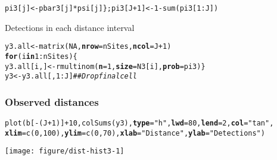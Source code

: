 \documentclass[color=usenames,dvipsnames]{beamer}\usepackage[]{graphicx}\usepackage[]{color}
\makeatletter
\newcommand{\hlnum}[1]{\textcolor[rgb]{0.69,0.494,0}{#1}}%
\newcommand{\hlstr}[1]{\textcolor[rgb]{0.749,0.012,0.012}{#1}}%
\newcommand{\hlcom}[1]{\textcolor[rgb]{0.514,0.506,0.514}{\textit{#1}}}%
\newcommand{\hlopt}[1]{\textcolor[rgb]{0,0,0}{#1}}%
\newcommand{\hlstd}[1]{\textcolor[rgb]{0,0,0}{#1}}%
\newcommand{\hlkwa}[1]{\textcolor[rgb]{0,0,0}{\textbf{#1}}}%
\newcommand{\hlkwb}[1]{\textcolor[rgb]{0,0.341,0.682}{#1}}%
\newcommand{\hlkwc}[1]{\textcolor[rgb]{0,0,0}{\textbf{#1}}}%
\newcommand{\hlkwd}[1]{\textcolor[rgb]{0.004,0.004,0.506}{#1}}%
\newenvironment{kframe}{%
 \def\at@end@of@kframe{}%
 \ifinner\ifhmode%
  \def\at@end@of@kframe{\end{minipage}}%
  \begin{minipage}{\columnwidth}%
 \fi\fi%
 \def\FrameCommand##1{\hskip\@totalleftmargin \hskip-\fboxsep
 \colorbox{shadecolor}{##1}\hskip-\fboxsep
     \hskip-\linewidth \hskip-\@totalleftmargin \hskip\columnwidth}%
 \MakeFramed {\advance\hsize-\width
   \@totalleftmargin\z@ \linewidth\hsize
   \@setminipage}}%
 {\par\unskip\endMakeFramed%
 \at@end@of@kframe}
\newenvironment{knitrout}{}{} %
\makeatother
\begin{document}
\begin{frame}[fragile]
\begin{knitrout}
\begin{kframe}
\begin{alltt}
    \hlstd{pi3[j]} \hlkwb{<-} \hlstd{pbar3[j]}\hlopt{*}\hlstd{psi[j] \}; pi3[J}\hlopt{+}\hlnum{1}\hlstd{]} \hlkwb{<-} \hlnum{1}\hlopt{-}\hlkwd{sum}\hlstd{(pi3[}\hlnum{1}\hlopt{:}\hlstd{J])}
\end{alltt}
\end{kframe}
\end{knitrout}
  \pause
  \vfill
  Detections in each distance interval
  \vspace{-6pt}
\begin{knitrout}\scriptsize
{}\color{fgcolor}\begin{kframe}
\begin{alltt}
\hlstd{y3.all} \hlkwb{<-} \hlkwd{matrix}\hlstd{(}\hlnum{NA}\hlstd{,} \hlkwc{nrow}\hlstd{=nSites,} \hlkwc{ncol}\hlstd{=J}\hlopt{+}\hlnum{1}\hlstd{)}
\hlkwa{for}\hlstd{(i} \hlkwa{in} \hlnum{1}\hlopt{:}\hlstd{nSites) \{}
    \hlstd{y3.all[i,]} \hlkwb{<-} \hlkwd{rmultinom}\hlstd{(}\hlkwc{n}\hlstd{=}\hlnum{1}\hlstd{,} \hlkwc{size}\hlstd{=N3[i],} \hlkwc{prob}\hlstd{=pi3)    \}}
\hlstd{y3} \hlkwb{<-} \hlstd{y3.all[,}\hlnum{1}\hlopt{:}\hlstd{J]}  \hlcom{## Drop final cell}
\end{alltt}
\end{kframe}
\end{knitrout}
\end{frame}



\begin{frame}[fragile]
  \frametitle{Observed distances}
  \centering
\begin{knitrout}\scriptsize
{}\color{fgcolor}\begin{kframe}
\begin{alltt}
\hlkwd{plot}\hlstd{(b[}\hlopt{-}\hlstd{(J}\hlopt{+}\hlnum{1}\hlstd{)]}\hlopt{+}\hlnum{10}\hlstd{,} \hlkwd{colSums}\hlstd{(y3),} \hlkwc{type}\hlstd{=}\hlstr{"h"}\hlstd{,} \hlkwc{lwd}\hlstd{=}\hlnum{80}\hlstd{,} \hlkwc{lend}\hlstd{=}\hlnum{2}\hlstd{,} \hlkwc{col}\hlstd{=}\hlstr{"tan"}\hlstd{,}
     \hlkwc{xlim}\hlstd{=}\hlkwd{c}\hlstd{(}\hlnum{0}\hlstd{,}\hlnum{100}\hlstd{),} \hlkwc{ylim}\hlstd{=}\hlkwd{c}\hlstd{(}\hlnum{0}\hlstd{,} \hlnum{70}\hlstd{),} \hlkwc{xlab}\hlstd{=}\hlstr{"Distance"}\hlstd{,} \hlkwc{ylab}\hlstd{=}\hlstr{"Detections"}\hlstd{)}
\end{alltt}
\end{kframe}
\texttt{[image: figure/dist-hist3-1]} 

\end{knitrout}
\end{frame}
\end{document}
